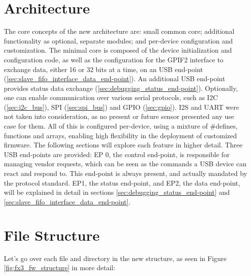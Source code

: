 \documentclass[a4paper,12pt]{report}
\begin{document}
\section{Architecture} \label{sec:architecture}

The core concepts of the new architecture are: small common core; additional functionality as optional, separate modules; and per-device configuration and customization.
The minimal core is composed of the device initialization and configuration code, as well as the configuration for the GPIF2 interface to exchange data, either 16 or 32 bits at a time, on an USB end-point (\ref{sec:slave_fifo_interface_data_end-point}). An additional USB end-point provides status data exchange (\ref{sec:debugging_status_end-point}). Optionally, one can enable communication over various serial protocols, such as I2C (\ref{sec:i2c_bus}), SPI (\ref{sec:spi_bus}) and GPIO (\ref{sec:gpio}). I2S and UART were not taken into consideration, as no present or future sensor presented any use case for them. All of this is configured per-device, using a mixture of \#defines, functions and arrays, enabling high flexibility in the deployment of customized firmware. The following sections will explore each feature in higher detail.
Three USB end-points are provided: EP 0, the control end-point, is responsible for managing vendor requests, which can be seen as the commands a USB device can react and respond to. This end-point is always present, and actually mandated by the protocol standard. EP1, the status end-point, and EP2, the data end-point, will be explained in detail in sections \ref{sec:debugging_status_end-point} and \ref{sec:slave_fifo_interface_data_end-point}.

\section{File Structure} \label{sec:file_structure}

Let's go over each file and directory in the new structure, as seen in Figure \ref{fig:fx3_fw_structure} in more detail:
\end{document}
